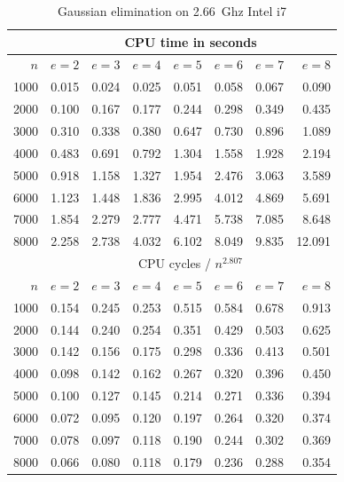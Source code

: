 \documentclass[11pt]{beamer}
\newcommand{\mycomputer}{2.66~Ghz Intel i7\xspace}
\begin{document}
\begin{frame}[allowframebreaks]
\begin{table}
\centering
\begin{scriptsize}
\begin{tabular}{|r||r|r|r|r|r|r|r|}
\hline
     & \multicolumn{7}{|c|}{CPU time in seconds}\\
\hline
$n$  & $e=2$ & $e=3$ & $e=4$ & $e=5$ & $e=6$ & $e=7$ & $e=8$\\
\hline
 1000 & 0.015 & 0.024 & 0.025 &  0.051 &  0.058 &  0.067 &  0.090\\
 2000 & 0.100 & 0.167 & 0.177 &  0.244 &  0.298 &  0.349 &  0.435\\
 3000 & 0.310 & 0.338 & 0.380 &  0.647 &  0.730 &  0.896 &  1.089\\
 4000 & 0.483 & 0.691 & 0.792 &  1.304 &  1.558 &  1.928 &  2.194\\
 5000 & 0.918 & 1.158 & 1.327 &  1.954 &  2.476 &  3.063 &  3.589\\
 6000 & 1.123 & 1.448 & 1.836 &  2.995 &  4.012 &  4.869 &  5.691\\
 7000 & 1.854 & 2.279 & 2.777 &  4.471 &  5.738 &  7.085 &  8.648\\
 8000 & 2.258 & 2.738 & 4.032 &  6.102 &  8.049 &  9.835 & 12.091\\
\hline
\hline
     & \multicolumn{7}{|c|}{CPU cycles / $n^{2.807}$}\\
\hline
$n$  & $e=2$ & $e=3$ & $e=4$ & $e=5$ & $e=6$ & $e=7$ & $e=8$\\
\hline
 1000 & 0.154 & 0.245 & 0.253 & 0.515 & 0.584 & 0.678 & 0.913\\
 2000 & 0.144 & 0.240 & 0.254 & 0.351 & 0.429 & 0.503 & 0.625\\
 3000 & 0.142 & 0.156 & 0.175 & 0.298 & 0.336 & 0.413 & 0.501\\
 4000 & 0.098 & 0.142 & 0.162 & 0.267 & 0.320 & 0.396 & 0.450\\
 5000 & 0.100 & 0.127 & 0.145 & 0.214 & 0.271 & 0.336 & 0.394\\
 6000 & 0.072 & 0.095 & 0.120 & 0.197 & 0.264 & 0.320 & 0.374\\
 7000 & 0.078 & 0.097 & 0.118 & 0.190 & 0.244 & 0.302 & 0.369\\
 8000 & 0.066 & 0.080 & 0.118 & 0.179 & 0.236 & 0.288 & 0.354\\
\hline
\end{tabular}
\end{scriptsize}
\caption{Gaussian elimination on \mycomputer}
\label{tab:moreelim}
\end{table}


\end{frame}
\end{document}
